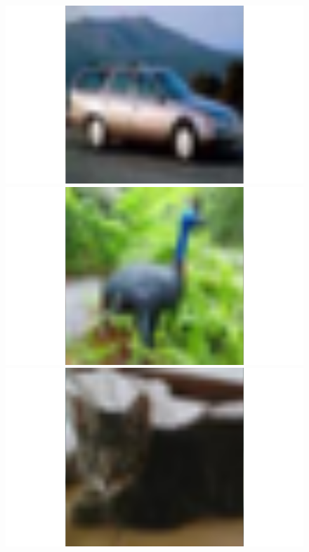 \begin{figure}
\begin{minipage}{0.32\textwidth}
\begin{minipage}{0.18\textwidth}
  \end{minipage}
  \begin{minipage}{0.18\textwidth}
    \includegraphics[width=1.2\textwidth]{../plots/cifar10-class1}
  \end{minipage}
  \begin{minipage}{0.18\textwidth}
    \includegraphics[width=1.2\textwidth]{../plots/cifar10-class2}
  \end{minipage}
  \begin{minipage}{0.18\textwidth}
    \includegraphics[width=1.2\textwidth]{../plots/cifar10-class3}

\end{minipage}
\end{minipage}
\end{figure}

